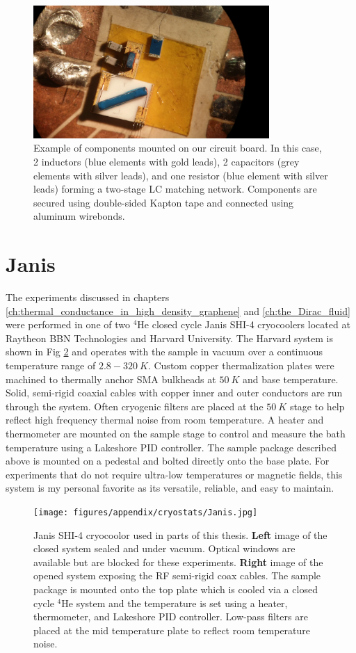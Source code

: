 \begin{figure}
\centering
\includegraphics[width = 0.8\textwidth]{figures/appendix/cryostats/sample_LC.jpg}
\caption{Example of components mounted on our circuit board. In this case, 2 inductors (blue elements with gold leads), 2 capacitors (grey elements with silver leads), and one resistor (blue element with silver leads) forming a two-stage LC matching network. Components are secured using double-sided Kapton tape and connected using aluminum wirebonds.}
\label{Fig:Appen:sample_LC}
\end{figure}


\section{Janis}

The experiments discussed in chapters \ref{ch:thermal_conductance_in_high_density_graphene} and \ref{ch:the_Dirac_fluid} were performed in one of two $^4$He closed cycle Janis SHI-4 cryocoolers located at Raytheon BBN Technologies and Harvard University. The Harvard system is shown in Fig \ref{Fig:Appen:Janis} and operates with the sample in vacuum over a continuous temperature range of $2.8-320~K$. Custom copper thermalization plates were machined to thermally anchor SMA bulkheads at $50~K$ and base temperature. Solid, semi-rigid coaxial cables with copper inner and outer conductors are run through the system. Often cryogenic filters are placed at the $50~K$ stage to help reflect high frequency thermal noise from room temperature. A heater and thermometer are mounted on the sample stage to control and measure the bath temperature using a Lakeshore PID controller. The sample package described above is mounted on a pedestal and bolted directly onto the base plate. For experiments that do not require ultra-low temperatures or magnetic fields, this system is my personal favorite as its versatile, reliable, and easy to maintain.
\begin{figure}
\centering
\texttt{[image: figures/appendix/cryostats/Janis.jpg]}
\caption{Janis SHI-4 cryocoolor used in parts of this thesis. \textbf{Left} image of the closed system sealed and under vacuum. Optical windows are available but are blocked for these experiments. \textbf{Right} image of the opened system exposing the RF semi-rigid coax cables. The sample package is mounted onto the top plate which is cooled via a closed cycle $^4$He system and the temperature is set using a heater, thermometer, and Lakeshore PID controller. Low-pass filters are placed at the mid temperature plate to reflect room temperature noise.}
\label{Fig:Appen:Janis}
\end{figure}

